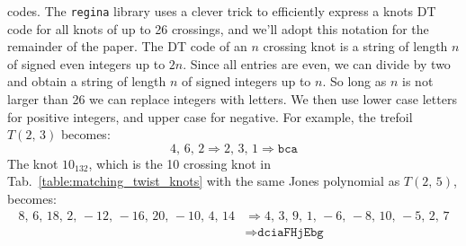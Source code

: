 \documentclass{article}
\theoremstyle{plain}
\begin{document}
        codes. The \texttt{regina} library \cite{regina} uses a clever trick to efficiently
        express a knots DT code for all knots of up to 26 crossings, and we'll
        adopt this notation for the remainder of the paper. The DT code of an
        $n$ crossing knot is a string of length $n$ of signed even integers up
        to $2n$. Since all entries are even, we can divide by two and obtain
        a string of length $n$ of signed integers up to $n$. So long as $n$ is
        not larger than 26 we can replace integers with letters. We then use
        lower case letters for positive integers, and upper case for negative.
        For example, the trefoil $T(2,\,3)$ becomes:
        \begin{equation}
            4,\,6,\,2
            \Rightarrow
            2,\,3,\,1
            \Rightarrow
            \texttt{bca}
        \end{equation}
        The knot $10_{132}$, which is the 10 crossing knot in
        Tab.~\ref{table:matching_twist_knots} with the same Jones polynomial
        as $T(2,\,5)$, becomes:
        \begin{align}
            8,\,6,\,18,\,2,\,-12,\,-16,\,20,\,-10,\,4,\,14
            &\Rightarrow
            4,\,3,\,9,\,1,\,-6,\,-8,\,10,\,-5,\,2,\,7\\
            &\Rightarrow
            \texttt{dciaFHjEbg}
        \end{align}
\end{document}
